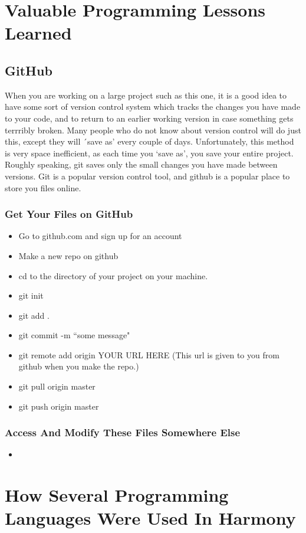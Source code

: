 \appendix
\chapter{Valuable Programming Lessons Learned} 

\section{GitHub}
When you are working on a large project such as this one, it is a good idea to have some sort of version control system which tracks the changes you have made to your code, and to return to an earlier working version in case something  gets terrribly broken. Many people who do not know about version control will do just this, except they will ´save as' every couple of days. Unfortunately, this method is very space inefficient, as each time you `save as', you save your entire project. Roughly speaking, git saves only the small changes you have made between versions. Git is a popular version control  tool, and github is a popular place to store you files online.
\subsection*{Get Your Files on GitHub}
\begin{itemize}
\item Go to github.com and sign up for an account
\item Make a new repo on github
\item cd to the directory of your project on your machine.
\item git init
\item git add .
\item git commit -m ``some message"
\item git remote add origin YOUR URL HERE (This url is given to you from github when you make the repo.)
\item git pull origin master
\item git push origin master
\end{itemize}

\subsection*{Access And Modify These Files Somewhere Else}
\begin{itemize}
\item
\end{itemize}

\chapter{How Several Programming Languages Were Used In Harmony}